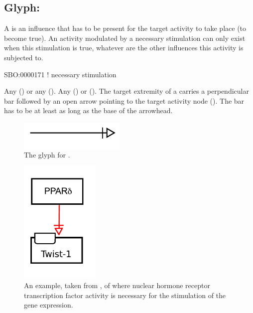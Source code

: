 \subsection{Glyph: }
\label{sec:af:trigger}
A  is an influence that has to be present for the target activity to take place (to become true).  An activity modulated by a necessary stimulation can only exist when this stimulation is true, whatever are the other influences this activity is subjected to.

\begin{glyphDescription}

\glyphSboTerm SBO:0000171 ! necessary stimulation

  \glyphOrigin Any  () or any  ().
 \glyphTarget Any  () or  ().
 \glyphEndPoint The target extremity of a  carries a perpendicular bar followed by an open arrow pointing to the target activity node ().  The bar has to be at least as long as the base of the arrowhead.

\end{glyphDescription}

\begin{figure}[H]
  \centering
  \includegraphics[width = 2in]{images/build/necessaryStimulation.pdf}
  \caption{The \AF glyph for .}
  \label{fig:af:trigger}
\end{figure}

\begin{figure}[H]
  \centering
  \includegraphics[width = 1.5in]{examples/ex-necessaryStimulation}
  \caption{An example, taken from , of  where nuclear hormone receptor  transcription factor activity is necessary for the stimulation of the  gene expression. }
  \label{fig:af:ex-NS}
\end{figure}

